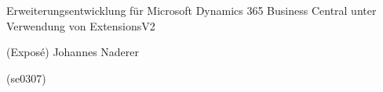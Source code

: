 \documentclass[bachelor,german]{hgbthesis}
\begin{document}

\begin{center}
	\begin{Huge}
	Erweiterungsentwicklung für Microsoft Dynamics 365 Business Central unter Verwendung von ExtensionsV2
	\end{Huge}

	\begin{Large}
	(Exposé) 
	\bigbreak
	Johannes Naderer
	
	(se0307)
	\end{Large}	
\end{center}
\begin{center}
	
\end{center}
\frontmatter                    %


\mainmatter          %









\MakeBibliography                        %



\end{document}

